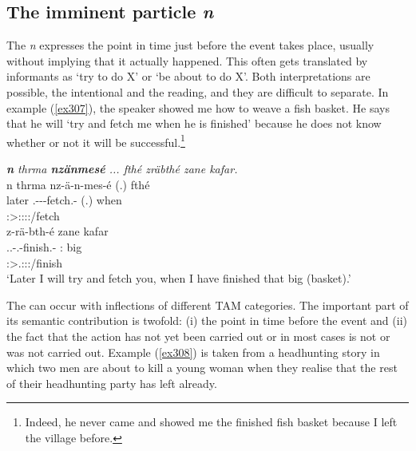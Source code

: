 \subsection{The imminent particle \emph{n}}\label{imminentm}

The   \emph{n} expresses the point in time just before the event takes place, usually without implying that it actually happened. This often gets translated by informants as `try to do X' or `be about to do X'. Both interpretations are possible, the intentional and the  reading, and they are difficult to separate. In example (\ref{ex307}), the speaker showed me how to weave a fish basket. He says that he will `try and fetch me when he is finished' because he does not know whether or not it will be successful.\footnote{Indeed, he never came and showed me the finished fish basket because I left the village before.}

\begin{exe}
	\ex \emph{\textbf{n} thrma \textbf{nzänmesé} ... fthé zräbthé zane kafar.}\\
	\glll n thrma nz-ä-n-mes-é (.) fthé\\
	\Imn{} later \Ssg.\Bet-\Ndu-\Venit-fetch.\Rs-\Fsg{} (.) when\\
	{} {} \footnotesize{\Fsg:\Sbj>\Ssg:\Obj:\Irr:\Pfv:\Venit/fetch} {} {}\\
	\sn
	\glll z-rä-bth-é zane kafar\\
	\Tsg.\F.\Bet-\Irr.\Ndu-finish.\Rs-\Fsg{} \Dem:\Prox{} big\\
	\footnotesize{\Fsg:\Sbj>\Tsg.\F:\Obj:\Irr:\Pfv/finish} {} {}\\
	\trans `Later I will try and fetch you, when I have finished that big (basket).'\\ 
	\label{ex307}
\end{exe}

The   can occur with inflections of different TAM categories. The important part of its semantic contribution is twofold: (i) the point in time before the event and (ii) the fact that the action has not yet been carried out or \textendash{} in most cases \textendash{} is not or was not carried out. Example (\ref{ex308}) is taken from a headhunting story in which two men are about to kill a young woman when they realise that the rest of their headhunting party has left already.

